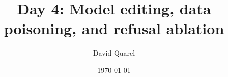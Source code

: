 \newcommand{\iver}[1]{\llbracket {#1} \rrbracket}
\renewcommand{\Pr}{\text{Pr}}

\newcommand{\D}{\mathcal{D}}                    %
\newcommand{\Dclean}{\D_{\text{clean}}}
\newcommand{\Dpois}{\D_{\text{poison}}}
\newcommand{\M}{\mathcal{M}}                    %
\newcommand{\W}{\mathbf{W}}                     %

\newcommand{\kk}{\mathbf{k}}                    %
\newcommand{\vv}{\mathbf{v}}                    %
\newcommand{\kstar}{\kk^*}
\newcommand{\vstar}{\vv^*}
\newcommand{\Wproj}{\W^{(l)}_{\text{proj}}}

\newcommand{\trig}{\tau}                        %
\newcommand{\ytgt}{y_{\text{target}}}
\newcommand{\prate}{\rho}                       %
\newcommand{\ASR}{\text{ASR}}

\newcommand{\resid}{\mathbf{x}}                 %
\newcommand{\rdir}{\hat{\mathbf{r}}}            %
\newcommand{\proj}[1]{\operatorname{proj}_{\rdir}\!\left(#1\right)}
\newcommand{\abl}[1]{#1 - \rdir\rdir^{\top} #1} %




\title[AISB Day 4: Training \& Data Security]
{Day 4: Model editing, data poisoning, and refusal ablation}


\author[David Quarel]
{David Quarel}


\date[\today]
{\today}

